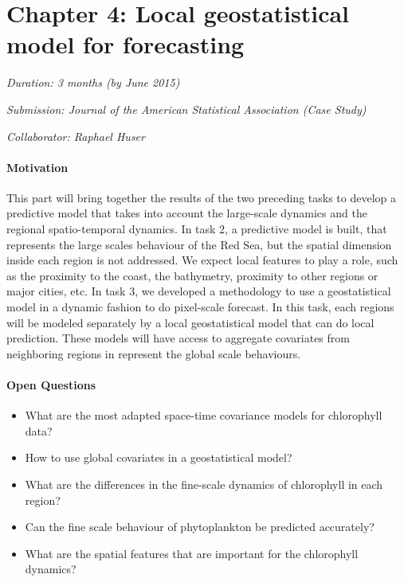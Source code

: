 \section{Chapter 4: Local geostatistical model for forecasting}

\noindent
\emph{Duration: 3 months (by June 2015)}

\noindent
\emph{Submission: Journal of the American Statistical Association (Case Study)}

\noindent
\emph{Collaborator: Raphael Huser}

\paragraph{Motivation}

This part will bring together the results of the two preceding tasks to develop a predictive model that takes into account the large-scale dynamics and the regional spatio-temporal dynamics. In task 2, a predictive model is built, that represents the large scales behaviour of the Red Sea, but the spatial dimension inside each region is not addressed. We expect local features to play a role, such as the proximity to the coast, the bathymetry, proximity to other regions or major cities, etc. In task 3, we developed a methodology to use a geostatistical model in a dynamic fashion to do pixel-scale forecast. In this task, each regions will be modeled separately by a local geostatistical model that can do local prediction. These models will have access to aggregate covariates from neighboring regions in represent the global scale behaviours. 

\paragraph{Open Questions}

\begin{itemize}
\item What are the most adapted space-time covariance models for chlorophyll data?
\item How to use global covariates in a geostatistical model?
\item What are the differences in the fine-scale dynamics of chlorophyll in each region?
\item Can the fine scale behaviour of phytoplankton be predicted accurately?
\item What are the spatial features that are important for the chlorophyll dynamics?
\end{itemize}

